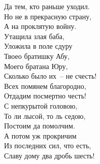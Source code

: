 {\begin{multicols}{2}
    Да тем, кто раньше уходил.\\
    Но не в прекрасную страну,\\
    А на проклятую войну.\\
    \vfill
    \noindent
    Утащила злая баба,\\
    Уложила в поле сдуру\\
    Твоео братишку Абу,\\
    Моего братана Юру,\\
    Сколько было их~-- не счесть!\\
    Всех помянем благородно,\\
    Отдадим посмертно честь!\\
    \vfill
    \noindent
    С непкурытой головою,\\
    То ли лысой, то ль седою,\\
    Постоим да помолчим.\\
    А потом уж прокричим\\
    Из последних сил, что есть,\\
    Славу дому два дробь шесть!\\
\end{multicols}
\vspace*{-5mm}
}


\restoregeometry
